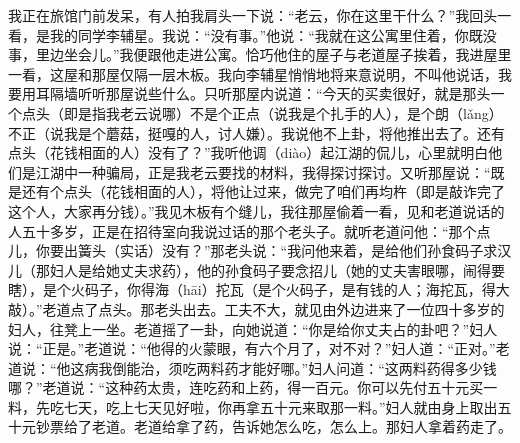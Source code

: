 \documentclass[12pt,UTF8]{ctexbook}
\begin{document}
我正在旅馆门前发呆，有人拍我肩头一下说：“老云，你在这里干什么？”我回头一看，是我的同学李辅星。我说：“没有事。”他说：“我就在这公寓里住着，你既没事，里边坐会儿。”我便跟他走进公寓。恰巧他住的屋子与老道屋子挨着，我进屋里一看，这屋和那屋仅隔一层木板。我向李辅星悄悄地将来意说明，不叫他说话，我要用耳隔墙听听那屋说些什么。只听那屋内说道：“今天的买卖很好，就是那头一个点头（即是指我老云说哪）不是个正点（说我是个扎手的人），是个朗（lǎng）不正（说我是个蘑菇，挺嘎的人，讨人嫌）。我说他不上卦，将他推出去了。还有点头（花钱相面的人）没有了？”我听他调（diào）起江湖的侃儿，心里就明白他们是江湖中一种骗局，正是我老云要找的材料，我得探讨探讨。又听那屋说：“既是还有个点头（花钱相面的人），将他让过来，做完了咱们再均杵（即是敲诈完了这个人，大家再分钱）。”我见木板有个缝儿，我往那屋偷着一看，见和老道说话的人五十多岁，正是在招待室向我说过话的那个老头子。就听老道问他：“那个点儿，你要出簧头（实话）没有？”那老头说：“我问他来着，是给他们孙食码子求汉儿（那妇人是给她丈夫求药），他的孙食码子要念招儿（她的丈夫害眼哪，闹得要瞎），是个火码子，你得海（hāi）拕瓦（是个火码子，是有钱的人；海拕瓦，得大敲）。”老道点了点头。那老头出去。工夫不大，就见由外边进来了一位四十多岁的妇人，往凳上一坐。老道摇了一卦，向她说道：“你是给你丈夫占的卦吧？”妇人说：“正是。”老道说：“他得的火蒙眼，有六个月了，对不对？”妇人道：“正对。”老道说：“他这病我倒能治，须吃两料药才能好哪。”妇人问道：“这两料药得多少钱哪？”老道说：“这种药太贵，连吃药和上药，得一百元。你可以先付五十元买一料，先吃七天，吃上七天见好啦，你再拿五十元来取那一料。”妇人就由身上取出五十元钞票给了老道。老道给拿了药，告诉她怎么吃，怎么上。那妇人拿着药走了。
\end{document}
